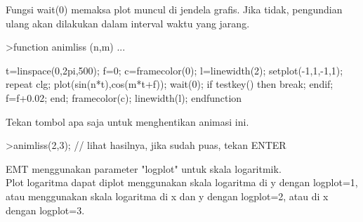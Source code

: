 \documentclass{article}
\begin{document}
\begin{eulernotebook}
\begin{eulercomment}
\begin{eulercomment}
\begin{eulercomment}
\begin{eulercomment}
\begin{eulercomment}
\begin{eulercomment}
\begin{eulercomment}
\begin{eulercomment}
\begin{eulercomment}
\begin{eulercomment}
\begin{eulercomment}
\begin{eulercomment}
\begin{eulercomment}
Fungsi wait(0) memaksa plot muncul di jendela grafis. Jika tidak,
pengundian ulang akan dilakukan dalam interval waktu yang jarang.
\end{eulercomment}
\begin{eulerprompt}
>function animliss (n,m) ...
\end{eulerprompt}
\begin{eulerudf}
  t=linspace(0,2pi,500);
  f=0;
  c=framecolor(0);
  l=linewidth(2);
  setplot(-1,1,-1,1);
  repeat
    clg;
    plot(sin(n*t),cos(m*t+f));
    wait(0);
    if testkey() then break; endif;
    f=f+0.02;
  end;
  framecolor(c);
  linewidth(l);
  endfunction
\end{eulerudf}
\begin{eulercomment}
Tekan tombol apa saja untuk menghentikan animasi ini.
\end{eulercomment}
\begin{eulerprompt}
>animliss(2,3); // lihat hasilnya, jika sudah puas, tekan ENTER
\end{eulerprompt}
\begin{eulercomment}
EMT menggunakan parameter "logplot" untuk skala logaritmik.\\
Plot logaritma dapat diplot menggunakan skala logaritma di y dengan
logplot=1, atau menggunakan skala logaritma di x dan y dengan
logplot=2, atau di x dengan logplot=3.


\end{eulercomment}
\end{eulercomment}
\end{eulercomment}
\end{eulercomment}
\end{eulercomment}
\end{eulercomment}
\end{eulercomment}
\end{eulercomment}
\end{eulercomment}
\end{eulercomment}
\end{eulercomment}
\end{eulercomment}
\end{eulercomment}
\end{eulernotebook}
\end{document}
